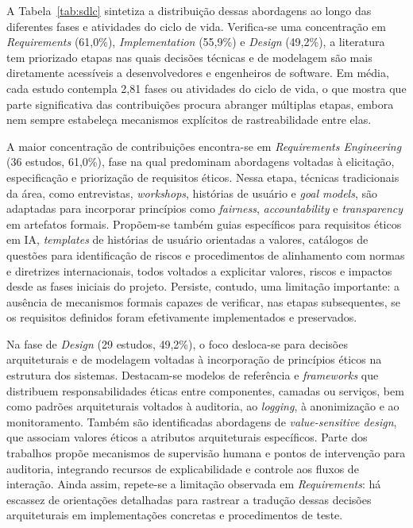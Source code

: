 A Tabela~\ref{tab:sdlc} sintetiza a distribuição dessas abordagens ao longo das diferentes fases e atividades do ciclo de vida. Verifica-se uma concentração em \textit{Requirements} (61,0\%), \textit{Implementation} (55,9\%) e \textit{Design} (49,2\%), a literatura tem priorizado etapas nas quais decisões técnicas e de modelagem são mais diretamente acessíveis a desenvolvedores e engenheiros de software. Em média, cada estudo contempla 2,81 fases ou atividades do ciclo de vida, o que mostra que parte significativa das contribuições procura abranger múltiplas etapas, embora nem sempre estabeleça mecanismos explícitos de rastreabilidade entre elas.

A maior concentração de contribuições encontra-se em \textit{Requirements Engineering} (36 estudos, 61,0\%), fase na qual predominam abordagens voltadas à elicitação, especificação e priorização de requisitos éticos. Nessa etapa, técnicas tradicionais da área, como entrevistas, \textit{workshops}, histórias de usuário e \textit{goal models}, são adaptadas para incorporar princípios como \textit{fairness}, \textit{accountability} e \textit{transparency} em artefatos formais. Propõem-se também guias específicos para requisitos éticos em IA, \textit{templates} de histórias de usuário orientadas a valores, catálogos de questões para identificação de riscos e procedimentos de alinhamento com normas e diretrizes internacionais, todos voltados a explicitar valores, riscos e impactos desde as fases iniciais do projeto. Persiste, contudo, uma limitação importante: a ausência de mecanismos formais capazes de verificar, nas etapas subsequentes, se os requisitos definidos foram efetivamente implementados e preservados.

Na fase de \textit{Design} (29 estudos, 49,2\%), o foco desloca-se para decisões arquiteturais e de modelagem voltadas à incorporação de princípios éticos na estrutura dos sistemas. Destacam-se modelos de referência e \textit{frameworks} que distribuem responsabilidades éticas entre componentes, camadas ou serviços, bem como padrões arquiteturais voltados à auditoria, ao \textit{logging}, à anonimização e ao monitoramento. Também são identificadas abordagens de \textit{value-sensitive design}, que associam valores éticos a atributos arquiteturais específicos. Parte dos trabalhos propõe mecanismos de supervisão humana e pontos de intervenção para auditoria, integrando recursos de explicabilidade e controle aos fluxos de interação. Ainda assim, repete-se a limitação observada em \textit{Requirements}: há escassez de orientações detalhadas para rastrear a tradução dessas decisões arquiteturais em implementações concretas e procedimentos de teste.

